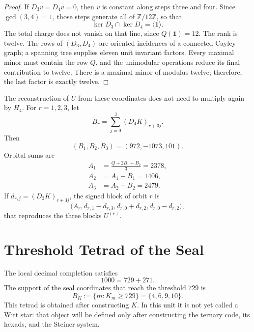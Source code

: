 \begin{proof}
If \(D_3v=D_4v=0\), then \(v\) is constant along steps
three and four. Since \(\gcd(3,4)=1\), those steps generate all of
\(\mathbb Z/12\mathbb Z\), so that
\[
 \ker D_3\cap\ker D_4=\langle\mathbf1\rangle.
\]
The total charge does not vanish on that line, since \(Q(\mathbf1)=12\). The rank
is twelve. The rows of \((D_3,D_4)\) are oriented incidences of a connected
Cayley graph; a spanning tree supplies eleven unit
invariant factors. Every maximal minor must contain the row \(Q\), and the
unimodular operations reduce its final contribution to twelve. There is a maximal minor of
modulus twelve; therefore, the last factor is exactly twelve.
\end{proof}

The reconstruction of \(U\) from these coordinates does not need to
multiply again by \(H_4\). For \(r=1,2,3\), let
\begin{equation}
 B_r=\sum_{j=0}^{3}(D_4K)_{r+3j}.
 \label{eq:br-diferencias-k}
\end{equation}
Then
\[
 (B_1,B_2,B_3)=(972,-1073,101).
\]
Orbital sums are
\begin{align}
 A_1&=\frac{Q+2B_1+B_2}{3}=2378,
 \label{eq:a1-reconstruccion-u}\\
 A_2&=A_1-B_1=1406,
 \label{eq:a2-reconstruccion-u}\\
 A_3&=A_2-B_2=2479.
 \label{eq:a3-reconstruccion-u}
\end{align}
If \(d_{r,j}=(D_3K)_{r+3j}\), the signed block of orbit \(r\) is
\begin{equation}
 \bigl(A_r,
 d_{r,1}-d_{r,3},
 d_{r,0}+d_{r,2},
 d_{r,0}-d_{r,2}\bigr),
 \label{eq:bloque-firmado-desde-diferencias}
\end{equation}
that reproduces the three blocks \(U^{(r)}\).

\section{Threshold Tetrad of the Seal}

The local decimal completion satisfies
\[
 1000=729+271.
\]
The support of the seal coordinates that reach the threshold \(729\) is
\begin{equation}
 \boxed{
 B_K:=\{m:K_m\geq729\}=\{4,6,9,10\}.}
 \label{eq:tetrada-umbral-k}
\end{equation}
This tetrad is obtained after constructing \(K\). In this unit it is not yet
called a Witt star: that object will be defined only after
constructing the ternary code, its hexads, and the Steiner system.

